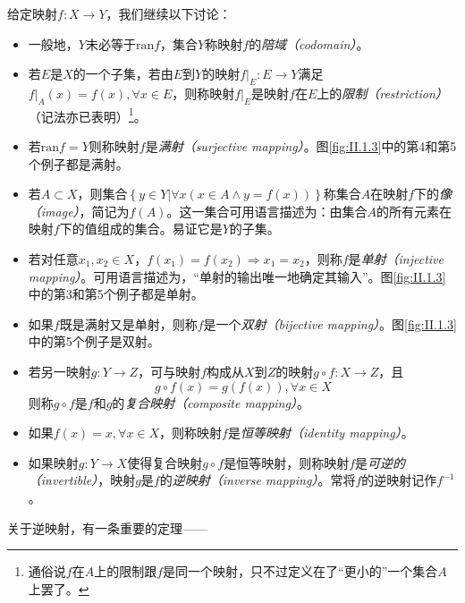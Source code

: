 \documentclass[../main.tex]{subfiles}
\begin{document}
给定映射$f:X\rightarrow Y$，我们继续以下讨论：
\begin{itemize}
    \item 一般地，$Y$未必等于$\mathrm{ran}f$，集合$Y$称映射$f$的\emph{陪域（codomain）}。
    \item 若$E$是$X$的一个子集，若由$E$到$Y$的映射$\left.f\right|_E:E\rightarrow Y$满足$\left.f\right|_A\left(x\right)=f\left(x\right),\forall x\in E$，则称映射$\left.f\right|_E$是映射$f$在$E$上的\emph{限制（restriction）}（记法亦已表明）\footnote{通俗说$f$在$A$上的限制跟$f$是同一个映射，只不过定义在了“更小的”一个集合$A$上罢了。}。
    \item 若$\mathrm{ran}f=Y$则称映射$f$是\emph{满射（surjective mapping）}。图\ref{fig:II.1.3}中的第4和第5个例子都是满射。
    \item 若$A\subset X$，则集合$\left\{y\in Y|\forall x\left(x\in A\wedge y=f\left(x\right)\right)\right\}$称集合$A$在映射$f$下的\emph{像（image）}，简记为$f\left(A\right)$。这一集合可用语言描述为：由集合$A$的所有元素在映射$f$下的值组成的集合。易证它是$Y$的子集。
    \item 若对任意$x_1,x_2\in X$，$f\left(x_1\right)=f\left(x_2\right)\Rightarrow x_1=x_2$，则称$f$是\emph{单射（injective mapping）}。可用语言描述为，“单射的输出唯一地确定其输入”。图\ref{fig:II.1.3}中的第3和第5个例子都是单射。
    \item 如果$f$既是满射又是单射，则称$f$是一个\emph{双射（bijective mapping）}。图\ref{fig:II.1.3}中的第5个例子是双射。
    \item 若另一映射$g:Y\rightarrow Z$，可与映射$f$构成从$X$到$Z$的映射$g\circ f:X\rightarrow Z$，且
          \[
              g\circ f\left(x\right)=g\left(f\left(x\right)\right),\forall x\in X
          \]
          则称$g\circ f$是$f$和$g$的\emph{复合映射（composite mapping）}。
    \item 如果$f\left(x\right)=x,\forall x\in X$，则称映射$f$是\emph{恒等映射（identity mapping）}。
    \item 如果映射$g:Y\rightarrow X$使得复合映射$g\circ f$是恒等映射，则称映射$f$是\emph{可逆的（invertible）}，映射$g$是$f$的\emph{逆映射（inverse mapping）}。常将$f$的逆映射记作$f^{-1}$。
\end{itemize}

关于逆映射，有一条重要的定理——
\end{document}

